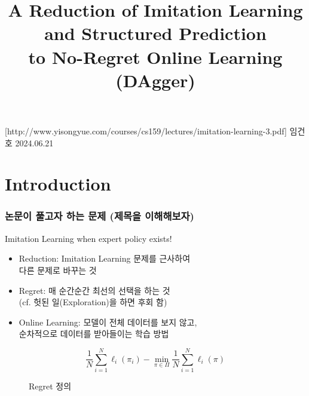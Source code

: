 \documentclass[11pt,xcolor={dvipsnames},hyperref={pdftex,pdfpagemode=UseNone,hidelinks,pdfdisplaydoctitle=true},usepdftitle=false]{beamer}
\begin{document}
\title{A Reduction of Imitation Learning and Structured Prediction \\ to No-Regret Online Learning (DAgger)}
\information
% 
[http://www.yisongyue.com/courses/cs159/lectures/imitation-learning-3.pdf]
% 
{임건호}
% 
{2024.06.21}

\frame{\titlepage}

\section{Introduction}

\begin{frame}
\frametitle{논문이 풀고자 하는 문제 {\small (제목을 이해해보자)}}

Imitation Learning when expert policy exists!

\begin{itemize}
\item Reduction: Imitation Learning 문제를 근사하여 \\ 다른 문제로 바꾸는 것
\item Regret: 매 순간순간 최선의 선택을 하는 것 \\ {\footnotesize (cf. 헛된 일(Exploration)을 하면 후회 함)}
\item Online Learning: 모델이 전체 데이터를 보지 않고, \\ 순차적으로 데이터를 받아들이는 학습 방법
\end{itemize}



\vspace{-10mm}

\begin{figure}
    \centering
    \begin{equation}
        \frac{1}{N} \sum_{i=1}^N \ell_i(\pi_i) - \min_{\pi \in \Pi} \frac{1}{N} \sum_{i=1}^N \ell_i(\pi)
    \end{equation}
    \vspace{-5mm}
    \caption{Regret 정의}
\end{figure}
\end{frame}
\end{document}
